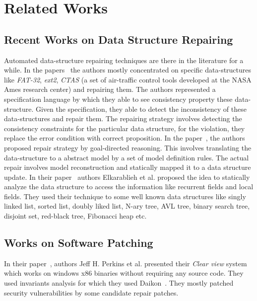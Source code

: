 

\section{Related Works}
\label{sec:relatedWorks}

\subsection{Recent Works on Data Structure Repairing}
\label{subsec:RecWorksDataStructure}

Automated data-structure repairing techniques are there in the literature for a
while. In the
papers~\cite{conf/oopsla/DemskyR03, Demsky03automaticdata, conf/icse/DemskyR05,
conf/issre/DemskyR03, conf/issta/DemskyEGMPR06} the authors mostly concentrated
on specific data-structures like \emph{FAT-32}, \emph{ext2}, \emph{CTAS} (a set
of air-traffic control tools developed at the NASA Ames research center) and
repairing them. The authors represented a specification language by which they
able to see consistency property these data-structure. Given the specification,
they able to detect the inconsistency of these data-structures and repair them.
The repairing strategy involves detecting the consistency constraints for the
particular data structure, for the violation, they replace the error condition
with correct proposition. In the paper~\cite{conf/icse/DemskyR05}, the
authors proposed repair strategy by goal-directed reasoning. This involves
translating the data-structure to a abstract model by a set of model definition
rules. The actual repair involves model reconstruction and statically mapped it
to a data structure update. In their paper~\cite{conf/oopsla/2007} authors
Elkarablieh et al. proposed the idea to statically analyze the data structure to
access the information like recurrent fields and local fields. They used their
technique to some well known data structures like singly linked list, sorted
list, doubly liked list, N-ary tree, AVL tree, binary search tree, disjoint set,
red-black tree, Fibonacci heap etc.

\subsection{Works on Software Patching}
\label{subsec:RecWorksSoftPatch}

In their paper~\cite{conf/sosp/PerkinsKLABCPSSSWZER09}, authors Jeff H.
Perkins et al. presented their \emph{Clear view} system which works on windows
x86 binaries without requiring any source code. They used invariants analysis
for
which they used Daikon~\cite{journals/scp/ErnstPGMPTX07}. They mostly
patched security vulnerabilities by some candidate repair patches.

